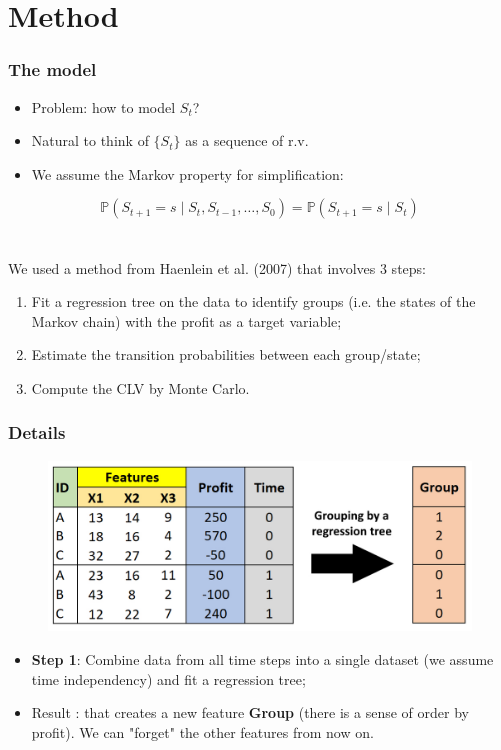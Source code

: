 \documentclass[aspectratio=169,xcolor=x11names,compress]{beamer}
\newcommand{\Prob}{\mathbb{P}}
\begin{document}
\section{Method}

\begin{frame}
\frametitle{The model}

\begin{itemize}
	\item Problem: how to model $S_t$?
	\item Natural to think of $\{S_t\}$ as a sequence of r.v.
	\item We assume the Markov property for simplification:
\end{itemize}
\[ \Prob(S_{t+1} = s \mid S_t, S_{t-1}, \dots, S_0) = \Prob(S_{t+1} = s \mid S_t) \]
\\~\\
We used a method from Haenlein et al. (2007) that involves 3 steps:

\begin{enumerate}
	\item Fit a regression tree on the data to identify groups (i.e. the states of the Markov chain) with the profit as a target variable;
	\item Estimate the transition probabilities between each group/state;
	\item Compute the CLV by Monte Carlo.
\end{enumerate}

\end{frame}


\begin{frame}
\frametitle{Details}

\begin{figure}
	\includegraphics[scale = 0.3]{tree_result.jpg}
\end{figure}
	
\begin{itemize}
	\item \textbf{Step 1}: Combine data from all time steps into a single dataset (we assume time independency) and fit a regression tree;
	\item Result : that creates a new feature \textbf{Group} (there is a sense of order by profit). We can "forget" the other features from now on. 
\end{itemize}
\end{frame}
\end{document}
